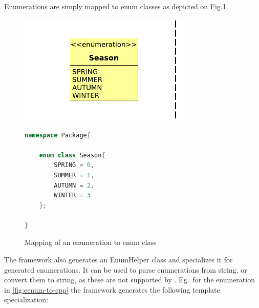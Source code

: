 Enumerations are simply mapped to \cpp{} enum classes as depicted on Fig.\ref{fig:eenum-to-cpp}.

\begin{figure}[H]
	\begin{center}
		
		\begin{minipage}[c]{\textwidth}
		\begin{minipage}[r]{0.52\textwidth}
			\hfill
			\includegraphics[width=0.735\textwidth]{figures/eenum-to-cpp.pdf}
		\end{minipage}
			\hspace{0.05\textwidth}
		\begin{minipage}[c]{0.25\textwidth}
\begin{lstlisting}[language=C++]
namespace Package{
	
	enum class Season{
		SPRING = 0,
		SUMMER = 1,
		AUTUMN = 2,
		WINTER = 3
	};

}
\end{lstlisting}			
		\end{minipage}
		\end{minipage}
		\caption{Mapping of an enumeration to \protect\cpp{} enum class }
		\label{fig:eenum-to-cpp}
	\end{center}
\end{figure}


The framework also generates an EnumHelper class and specializes it for generated enumerations. It can be used to  parse enumerations from string, or convert them to string, as these are not supported by \cpp{}. Eg.\ for the enumeration in \autoref{fig:eenum-to-cpp} the framework generates the following template specialization:

